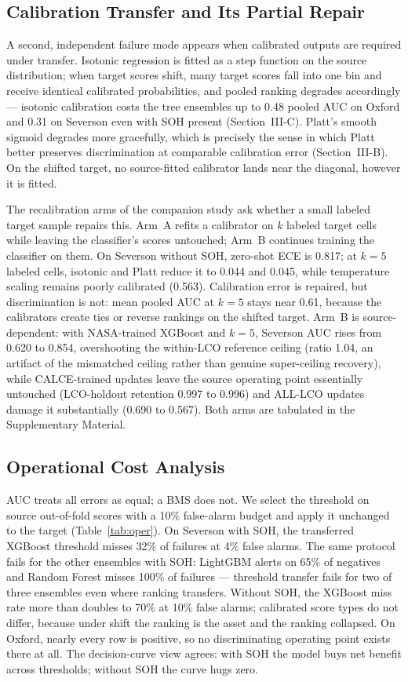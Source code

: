 \subsection{Calibration Transfer and Its Partial Repair}
A second, independent failure mode appears when calibrated outputs are required under transfer. Isotonic regression is fitted as a step function on the source distribution; when target scores shift, many target scores fall into one bin and receive identical calibrated probabilities, and pooled ranking degrades accordingly --- isotonic calibration costs the tree ensembles up to 0.48 pooled AUC on Oxford and 0.31 on Severson even with SOH present (Section~III-C). Platt's smooth sigmoid degrades more gracefully, which is precisely the sense in which Platt better preserves discrimination at comparable calibration error (Section~III-B). On the shifted target, no source-fitted calibrator lands near the diagonal, however it is fitted.

The recalibration arms of the companion study \cite{shikdar2026robustness} ask whether a small labeled target sample repairs this. Arm~A refits a calibrator on $k$ labeled target cells while leaving the classifier's scores untouched; Arm~B continues training the classifier on them. On Severson without SOH, zero-shot ECE is 0.817; at $k{=}5$ labeled cells, isotonic and Platt reduce it to 0.044 and 0.045, while temperature scaling remains poorly calibrated (0.563). Calibration error is repaired, but discrimination is not: mean pooled AUC at $k{=}5$ stays near 0.61, because the calibrators create ties or reverse rankings on the shifted target. Arm~B is source-dependent: with NASA-trained XGBoost and $k{=}5$, Severson AUC rises from 0.620 to 0.854, overshooting the within-LCO reference ceiling (ratio 1.04, an artifact of the mismatched ceiling rather than genuine super-ceiling recovery), while CALCE-trained updates leave the source operating point essentially untouched (LCO-holdout retention 0.997 to 0.996) and ALL-LCO updates damage it substantially (0.690 to 0.567). Both arms are tabulated in the Supplementary Material.

\subsection{Operational Cost Analysis}
AUC treats all errors as equal; a BMS does not. We select the threshold on source out-of-fold scores with a 10\% false-alarm budget and apply it unchanged to the target (Table~\ref{tab:oper}). On Severson with SOH, the transferred XGBoost threshold misses 32\% of failures at 4\% false alarms. The same protocol fails for the other ensembles with SOH: LightGBM alerts on 65\% of negatives and Random Forest misses 100\% of failures --- threshold transfer fails for two of three ensembles even where ranking transfers. Without SOH, the XGBoost miss rate more than doubles to 70\% at 10\% false alarms; calibrated score types do not differ, because under shift the ranking is the asset and the ranking collapsed. On Oxford, nearly every row is positive, so no discriminating operating point exists there at all. The decision-curve view agrees: with SOH the model buys net benefit across thresholds; without SOH the curve hugs zero.

